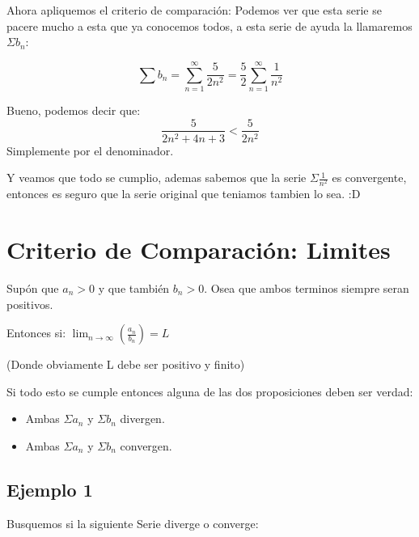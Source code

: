 \documentclass[12pt]{report}							    %
\begin{document}
        Ahora apliquemos el criterio de comparación: Podemos ver que esta serie se pacere mucho a esta
        que ya conocemos todos, a esta serie de ayuda la llamaremos $\Sigma b_n$:

        \begin{equation*}
            \sum b_n = \sum_{n=1}^{\infty} \frac{5}{2n^2} = \frac{5}{2}\sum_{n=1}^{\infty} \frac{1}{n^2}
        \end{equation*}

        Bueno, podemos decir que:
        \begin{equation*}
            \frac{5}{2n^2 +4n +3} < \frac{5}{2n^2}
        \end{equation*}
        Simplemente por el denominador.

        Y veamos que todo se cumplio, ademas sabemos que la serie $\Sigma \frac{1}{n^2}$ es convergente,
        entonces es seguro que la serie original que teniamos tambien lo sea. :D



    \clearpage
    \section{Criterio de Comparación: Limites}

        Supón que $a _n > 0$ y que también $b_n > 0$. Osea que ambos terminos siempre seran positivos.

        Entonces si:
        $\lim_{n \to \infty} \left( \frac{a_n}{b_n} \right) = L$

        (Donde obviamente L debe ser positivo y finito)

        Si todo esto se cumple entonces alguna de las dos proposiciones deben ser verdad:
        \begin{itemize}
            \item Ambas $\Sigma a_n$ y $\Sigma b_n$ divergen.
            \item Ambas $\Sigma a_n$ y $\Sigma b_n$ convergen.
        \end{itemize}

        \subsection{Ejemplo 1}
        Busquemos si la siguiente Serie diverge o converge:
\end{document}

